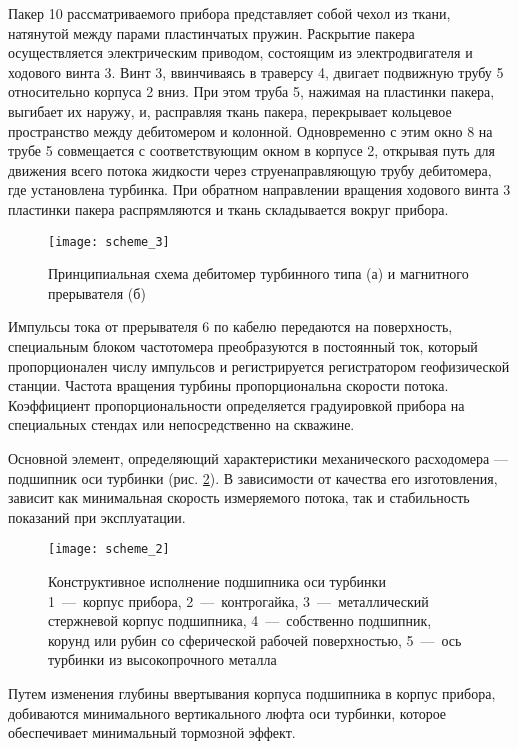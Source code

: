 Пакер 10 рассматриваемого прибора представляет собой чехол из ткани, натянутой между парами пластинчатых пружин. Раскрытие пакера осуществляется электрическим приводом, состоящим из электродвигателя и ходового винта 3. Винт 3, ввинчиваясь в травер­су 4, двигает подвижную трубу 5 относительно корпуса 2 вниз. При этом труба 5, нажимая на пластинки пакера, выгибает их наружу, и, расправляя ткань пакера, перекрывает кольцевое пространство меж­ду дебитомером и колонной. Одновременно с этим окно 8 на трубе 5 совмещается с соответствующим окном в корпусе 2, открывая путь для движения всего потока жидкости через струенаправляющую трубу дебитомера, где установлена турбинка. При обратном направ­лении вращения ходового винта 3 пластинки пакера распрямляются и ткань складывается вокруг прибора.

\begin{figure}[h]
\centering
\texttt{[image: scheme\_3]}
\caption{
Принципиальная схема дебитомер турбинного типа (а) и магнитного прерывателя (б)
}
\label{fig:scheme_3}
\end{figure}

Импульсы тока от прерывателя 6 по кабелю передаются на по­верхность, специальным блоком частотомера преобразуются в по­стоянный ток, который пропорционален числу импульсов и регистрируется регист­ратором геофизической станции. Частота вращения турбины пропор­циональна скорости потока. Коэффициент пропорциональности оп­ределяется градуировкой прибора на специальных стендах или не­посредственно на скважине.

Основной элемент, определяющий
характеристики механического расходомера ---
подшипник оси турбинки (рис. \ref{fig:scheme_2}). В зависимости от качества
его изготовления, зависит как минимальная скорость
измеряемого потока, так и стабильность показаний при
эксплуатации.

\begin{figure}[h]
\centering
\texttt{[image: scheme\_2]}
\caption{
Конструктивное исполнение подшипника оси турбинки \\
1~---~корпус прибора, 2~---~контрогайка,
3~---~металлический стержневой корпус подшипника,
4~---~собственно подшипник, корунд или рубин со сферической рабочей поверхностью,
5~---~ось турбинки из высокопрочного металла
}
\label{fig:scheme_2}
\end{figure}

Путем изменения глубины ввертывания корпуса подшипника в
корпус прибора, добиваются минимального вертикального люфта оси
турбинки, которое обеспечивает минимальный тормозной эффект.

